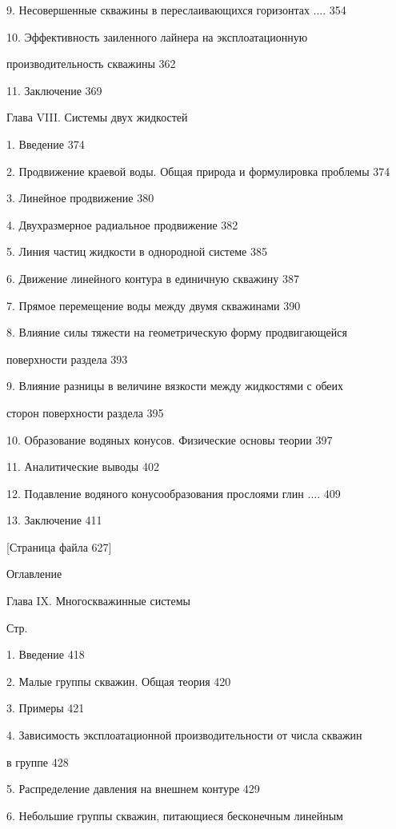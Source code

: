 \documentclass[
  11pt,
]{article}
\begin{document}
9. Несовершенные скважины в переслаивающихся горизонтах .... 354 \par
10. Эффективность заиленного лайнера на эксплоатационную  \par
производительность скважины 362 \par
11. Заключение 369 \par
Глава VIII. Системы двух жидкостей \par
1. Введение 374 \par
2. Продвижение краевой воды. Общая природа и формулировка проблемы 374 \par
3. Линейное продвижение 380 \par
4. Двухразмерное радиальное продвижение 382 \par
5. Линия частиц жидкости в однородной системе 385 \par
6. Движение линейного контура в единичную скважину 387 \par
7. Прямое перемещение воды между двумя скважинами 390 \par
8. Влияние силы тяжести на геометрическую форму продвигающейся  \par
поверхности раздела 393 \par
9. Влияние разницы в величине вязкости между жидкостями с обеих  \par
сторон поверхности раздела 395 \par
10. Образование водяных конусов. Физические основы теории 397 \par
11. Аналитические выводы 402 \par
12. Подавление водяного конусообразования прослоями глин .... 409 \par
13. Заключение 411 \par
\smallskip
\smallskip
\smallskip
{[}Страница файла 627{]}\par
Оглавление \par
Глава IX. Многоскважинные системы \par
Стр. \par
1. Введение 418 \par
2. Малые группы скважин. Общая теория 420 \par
3. Примеры 421 \par
4. Зависимость эксплоатационной производительности от числа скважин \par
в группе 428 \par
5. Распределение давления на внешнем контуре 429 \par
6. Небольшие группы скважин, питающиеся бесконечным линейным  \par
\end{document}
